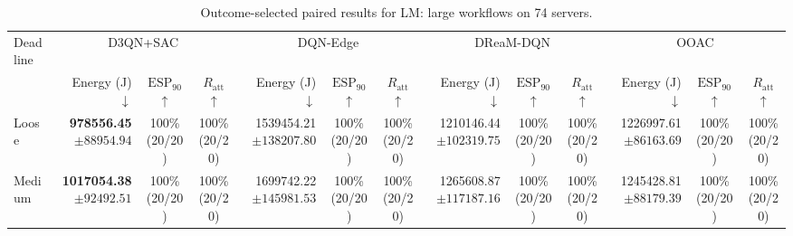 \documentclass[10pt]{article}
\begin{document}
\begin{table}[!htbp]
\centering
\caption{Outcome-selected paired results for LM: large workflows on 74 servers.}
\label{tab:conditional_case_lm}
\begingroup
\footnotesize
\setlength{\tabcolsep}{2.2pt}
\renewcommand{\arraystretch}{1.08}
\begin{tabular}{@{}l*{4}{rcc}@{}}
\toprule
Deadline & \multicolumn{3}{c}{D3QN+SAC} & \multicolumn{3}{c}{DQN-Edge} & \multicolumn{3}{c}{DReaM-DQN} & \multicolumn{3}{c}{OOAC} \\
\cmidrule(lr){2-4}\cmidrule(lr){5-7}\cmidrule(lr){8-10}\cmidrule(lr){11-13}
 & Energy (J) $\downarrow$ & $\mathrm{ESP}_{90}$ $\uparrow$ & $R_{\mathrm{att}}$ $\uparrow$ & Energy (J) $\downarrow$ & $\mathrm{ESP}_{90}$ $\uparrow$ & $R_{\mathrm{att}}$ $\uparrow$ & Energy (J) $\downarrow$ & $\mathrm{ESP}_{90}$ $\uparrow$ & $R_{\mathrm{att}}$ $\uparrow$ & Energy (J) $\downarrow$ & $\mathrm{ESP}_{90}$ $\uparrow$ & $R_{\mathrm{att}}$ $\uparrow$ \\
\midrule
Loose & \shortstack[r]{\textbf{978556.45}\\$\pm 88954.94$} & \shortstack[c]{100\%\\(20/20)} & \shortstack[c]{100\%\\(20/20)} & \shortstack[r]{1539454.21\\$\pm 138207.80$} & \shortstack[c]{100\%\\(20/20)} & \shortstack[c]{100\%\\(20/20)} & \shortstack[r]{1210146.44\\$\pm 102319.75$} & \shortstack[c]{100\%\\(20/20)} & \shortstack[c]{100\%\\(20/20)} & \shortstack[r]{1226997.61\\$\pm 86163.69$} & \shortstack[c]{100\%\\(20/20)} & \shortstack[c]{100\%\\(20/20)} \\
Medium & \shortstack[r]{\textbf{1017054.38}\\$\pm 92492.51$} & \shortstack[c]{100\%\\(20/20)} & \shortstack[c]{100\%\\(20/20)} & \shortstack[r]{1699742.22\\$\pm 145981.53$} & \shortstack[c]{100\%\\(20/20)} & \shortstack[c]{100\%\\(20/20)} & \shortstack[r]{1265608.87\\$\pm 117187.16$} & \shortstack[c]{100\%\\(20/20)} & \shortstack[c]{100\%\\(20/20)} & \shortstack[r]{1245428.81\\$\pm 88179.39$} & \shortstack[c]{100\%\\(20/20)} & \shortstack[c]{100\%\\(20/20)} \\

\end{tabular}
\end{table}
\end{document}
